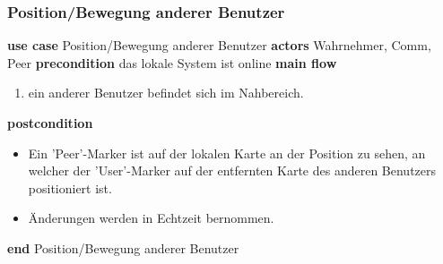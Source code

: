 \subsubsection{Position/Bewegung anderer Benutzer}\label{subsubsec:uc_watchposofpeer}
\noindent \textbf{use case} Position/Bewegung anderer Benutzer \newline
\indent \textbf{actors} \newline
\indent \indent Wahrnehmer, Comm, Peer \newline
\indent \textbf{precondition} \newline
\indent \indent das lokale System ist online \newline
\indent \textbf{main flow}
\begin{enumerate}[labelwidth=0pt,leftmargin=39pt,noitemsep,topsep=0pt,parsep=0pt,partopsep=0pt]
\item ein anderer Benutzer befindet sich im Nahbereich.
\end{enumerate}
\indent \indent \textbf{postcondition}
\begin{itemize}[label={},labelwidth=0pt,leftmargin=24pt,noitemsep,topsep=0pt,parsep=0pt,partopsep=0pt]
\item Ein 'Peer'-Marker ist auf der lokalen Karte an der Position zu sehen, an welcher der 'User'-Marker auf der entfernten Karte des anderen Benutzers positioniert ist.
\item Änderungen werden in Echtzeit bernommen.
\end{itemize}
\noindent \textbf{end} Position/Bewegung anderer Benutzer

